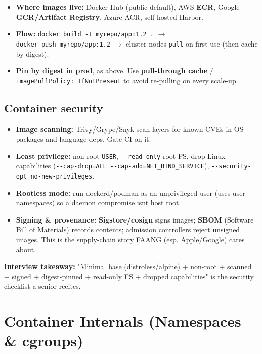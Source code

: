\documentclass[11pt]{article}
\providecommand{\tightlist}{\setlength{\itemsep}{1pt}\setlength{\parskip}{0pt}}
\begin{document}
\begin{itemize}
\tightlist
\item
  \textbf{Where images live:} Docker Hub (public default), AWS \textbf{ECR}, Google \textbf{GCR/Artifact Registry}, Azure ACR, self-hosted Harbor.
\item
  \textbf{Flow:} \texttt{docker\ build\ -t\ myrepo/app:1.2\ .} \(\rightarrow\) \texttt{docker\ push\ myrepo/app:1.2} \(\rightarrow\) cluster nodes \texttt{pull} on first use (then cache by digest).
\item
  \textbf{Pin by digest in prod}, as above. Use \textbf{pull-through cache} / \texttt{imagePullPolicy:\ IfNotPresent} to avoid re-pulling on every scale-up.
\end{itemize}

\subsection{Container security}\label{container-security}

\begin{itemize}
\tightlist
\item
  \textbf{Image scanning:} Trivy/Grype/Snyk scan layers for known CVEs in OS packages and language deps. Gate CI on it.
\item
  \textbf{Least privilege:} non-root \texttt{USER}, \texttt{-\/-read-only} root FS, drop Linux capabilities (\texttt{-\/-cap-drop=ALL\ -\/-cap-add=NET\_BIND\_SERVICE}), \texttt{-\/-security-opt\ no-new-privileges}.
\item
  \textbf{Rootless mode:} run dockerd/podman as an unprivileged user (uses user namespaces) so a daemon compromise isn\textquotesingle t host root.
\item
  \textbf{Signing \& provenance:} \textbf{Sigstore/cosign} signs images; \textbf{SBOM} (Software Bill of Materials) records contents; admission controllers reject unsigned images. This is the supply-chain story FAANG (esp. Apple/Google) cares about.
\end{itemize}

\textbf{Interview takeaway:} "Minimal base (distroless/alpine) + non-root + scanned + signed + digest-pinned + read-only FS + dropped capabilities" is the security checklist a senior recites.

\section{Container Internals (Namespaces \& cgroups)}\label{container-internals-namespaces--cgroups}
\end{document}

